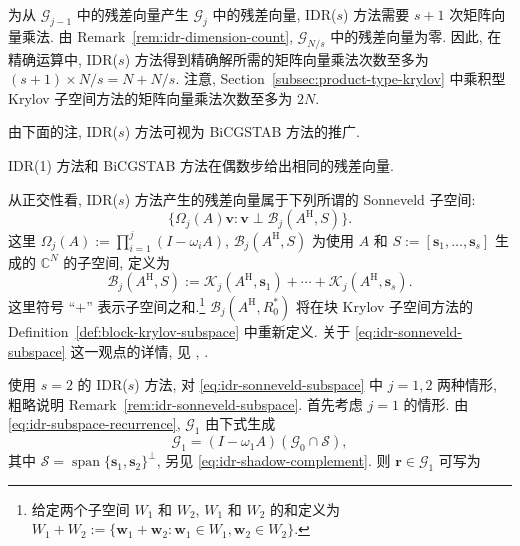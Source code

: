 \par{}
\begin{Remark}\label{rem:idr-matvec-bound}
{为从 $\mathcal G_{j-1}$ 中的残差向量产生 $\mathcal G_j$ 中的残差向量, IDR($s$) 方法需要 $s+1$ 次矩阵向量乘法. 由 Remark\ \ref{rem:idr-dimension-count}, $\mathcal G_{N/s}$ 中的残差向量为零. 因此, 在精确运算中, IDR($s$) 方法得到精确解所需的矩阵向量乘法次数至多为 $(s+1)\times N/s=N+N/s$. 注意, Section\ \ref{subsec:product-type-krylov} 中乘积型 Krylov 子空间方法的矩阵向量乘法次数至多为 $2N$.}
\end{Remark}
{由下面的注, IDR($s$) 方法可视为 BiCGSTAB 方法的推广.}
\par{}
\begin{Remark}\label{rem:idr-bicgstab-equivalence}
{IDR(1) 方法和 BiCGSTAB 方法在偶数步给出相同的残差向量.}
\end{Remark}
\par{}
\begin{Remark}\label{rem:idr-sonneveld-subspace}
{从正交性看, IDR($s$) 方法产生的残差向量属于下列所谓的 Sonneveld 子空间:}
\begin{equation}\label{eq:idr-sonneveld-subspace}\{\Omega_j(A)\bm v:\bm v\perp\mathcal B_j(A^{\mathrm H},S)\}.\end{equation}
{这里 $\Omega_j(A):=\prod_{i=1}^j(I-\omega_iA)$, $\mathcal B_j(A^{\mathrm H},S)$ 为使用 $A$ 和 $S:=[\bm s_1,\ldots,\bm s_s]$ 生成的 $\mathbb C^N$ 的子空间, 定义为}
\[\mathcal B_j(A^{\mathrm H},S):=\mathcal K_j(A^{\mathrm H},\bm s_1)+\cdots+\mathcal K_j(A^{\mathrm H},\bm s_s).\]
{这里符号 ``$+$'' 表示子空间之和.}\footnote{{给定两个子空间 $W_1$ 和 $W_2$, $W_1$ 和 $W_2$ 的和定义为 $W_1+W_2:=\{\bm w_1+\bm w_2:\bm w_1\in W_1,\bm w_2\in W_2\}$.}}
{$\mathcal B_j(A^{\mathrm H},R_0^{*})$ 将在块 Krylov 子空间方法的 Definition\ \ref{def:block-krylov-subspace} 中重新定义. 关于 \eqref{eq:idr-sonneveld-subspace} 这一观点的详情, 见 , .}
\end{Remark}
{使用 $s=2$ 的 IDR($s$) 方法, 对 \eqref{eq:idr-sonneveld-subspace} 中 $j=1,2$ 两种情形, 粗略说明 Remark\ \ref{rem:idr-sonneveld-subspace}. 首先考虑 $j=1$ 的情形. 由 \eqref{eq:idr-subspace-recurrence}, $\mathcal G_1$ 由下式生成}
\[\mathcal G_1=(I-\omega_1A)(\mathcal G_0\cap\mathcal S),\]
{其中 $\mathcal S=\operatorname{span}\{\bm s_1,\bm s_2\}^{\perp}$, 另见 \eqref{eq:idr-shadow-complement}. 则 $\bm r\in\mathcal G_1$ 可写为}
